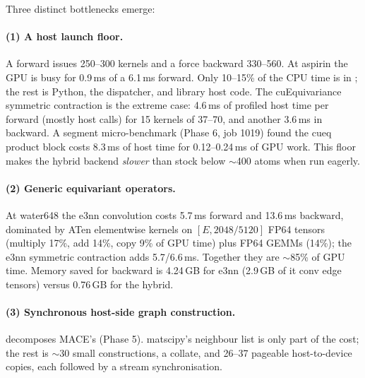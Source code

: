 Three distinct bottlenecks emerge:

\paragraph{(1) A host launch floor.} A forward issues 250--300 kernels and a force backward 330--560. At aspirin the GPU is busy for 0.9\,ms of a 6.1\,ms forward. Only 10--15\% of the CPU time is in ; the rest is Python, the dispatcher, and library host code. The cuEquivariance symmetric contraction is the extreme case: 4.6\,ms of profiled host time per forward (mostly  host calls) for 15 kernels of 37--70\us, and another 3.6\,ms in backward. A segment micro-benchmark (Phase 6, job 1019) found the cueq product block costs 8.3\,ms of host time for 0.12--0.24\,ms of GPU work. This floor makes the hybrid backend \emph{slower} than stock below $\sim$400 atoms when run eagerly.

\paragraph{(2) Generic equivariant operators.} At water648 the e3nn convolution costs 5.7\,ms forward and 13.6\,ms backward, dominated by ATen elementwise kernels on $[E,2048/5120]$ FP64 tensors (multiply 17\%, add 14\%, copy 9\% of GPU time) plus FP64 GEMMs (14\%); the e3nn symmetric contraction adds 5.7/6.6\,ms. Together they are $\sim$85\% of GPU time. Memory saved for backward is 4.24\,GB for e3nn (2.9\,GB of it conv edge tensors) versus 0.76\,GB for the hybrid.

\paragraph{(3) Synchronous host-side graph construction.}  decomposes MACE's  (Phase 5). matscipy's neighbour list is only part of the cost; the rest is $\sim$30 small  constructions, a collate, and 26--37 pageable host-to-device copies, each followed by a stream synchronisation.

